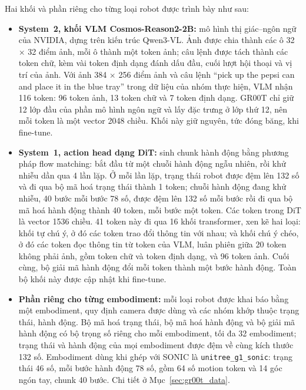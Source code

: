 \documentclass[12pt,a4paper,oneside]{report}
\newcommand{\code}[1]{\texttt{#1}}
\begin{document}
Hai khối và phần riêng cho từng loại robot được trình bày như sau:
\begin{itemize}
\item \textbf{System~2, khối VLM Cosmos-Reason2-2B:} mô hình thị giác--ngôn ngữ của NVIDIA, dựng trên kiến trúc Qwen3-VL. Ảnh được chia thành các ô 32 $\times$ 32 điểm ảnh, mỗi ô thành một token ảnh; câu lệnh được tách thành các token chữ, kèm vài token định dạng đánh dấu đầu, cuối lượt hội thoại và vị trí của ảnh. Với ảnh 384 $\times$ 256 điểm ảnh và câu lệnh ``pick up the pepsi can and place it in the blue tray'' trong dữ liệu của nhóm thực hiện, VLM nhận 116 token: 96 token ảnh, 13 token chữ và 7 token định dạng. GR00T chỉ giữ 12 lớp đầu của phần mô hình ngôn ngữ và lấy đặc trưng ở lớp thứ 12, nên mỗi token là một vector 2048 chiều. Khối này giữ nguyên, tức đóng băng, khi fine-tune.
\item \textbf{System~1, action head dạng DiT:} sinh chunk hành động bằng phương pháp flow matching: bắt đầu từ một chuỗi hành động ngẫu nhiên, rồi khử nhiễu dần qua 4 lần lặp. Ở mỗi lần lặp, trạng thái robot được đệm lên 132 số và đi qua bộ mã hoá trạng thái thành 1 token; chuỗi hành động đang khử nhiễu, 40 bước mỗi bước 78 số, được đệm lên 132 số mỗi bước rồi đi qua bộ mã hoá hành động thành 40 token, mỗi bước một token. Các token trong DiT là vector 1536 chiều. 41 token này đi qua 16 khối transformer, xen kẽ hai loại: khối tự chú ý, ở đó các token trao đổi thông tin với nhau; và khối chú ý chéo, ở đó các token đọc thông tin từ token của VLM, luân phiên giữa 20 token không phải ảnh, gồm token chữ và token định dạng, và 96 token ảnh. Cuối cùng, bộ giải mã hành động đổi mỗi token thành một bước hành động. Toàn bộ khối này được cập nhật khi fine-tune.
\item \textbf{Phần riêng cho từng embodiment:} mỗi loại robot được khai báo bằng một embodiment, quy định camera được dùng và các nhóm khớp thuộc trạng thái, hành động. Bộ mã hoá trạng thái, bộ mã hoá hành động và bộ giải mã hành động có bộ trọng số riêng cho mỗi embodiment, tối đa 32 embodiment; trạng thái và hành động của mọi embodiment được đệm về cùng kích thước 132 số. Embodiment dùng khi ghép với SONIC là \code{unitree\_g1\_sonic}: trạng thái 46 số, mỗi bước hành động 78 số, gồm 64 số motion token và 14 góc ngón tay, chunk 40 bước. Chi tiết ở Mục~\ref{sec:gr00t_data}.
\end{itemize}
\end{document}
